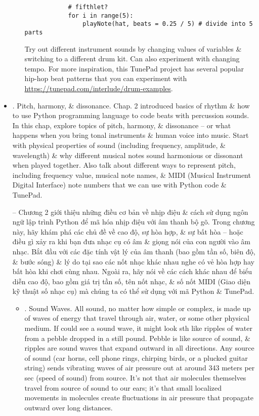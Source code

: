 \documentclass{article}
\begin{document}
\begin{itemize}
\begin{enumerate}
\begin{verbatim}
			# fifthlet?
			for i in range(5):
			    playNote(hat, beats = 0.25 / 5) # divide into 5 parts
		\end{verbatim}
		Try out different instrument sounds by changing values of variables \& switching to a different drum kit. Can also experiment with changing tempo. For more inspiration, this TunePad project has several popular hip-hop beat patterns that you can experiment with \url{https://tunepad.com/interlude/drum-examples}.
	\end{enumerate}
	\item {. Pitch, harmony, \& dissonance.} Chap. 2 introduced basics of rhythm \& how to use Python programming language to code beats with percussion sounds. In this chap, explore topics of pitch, harmony, \& dissonance -- or what happens when you bring tonal instruments \& human voice into music. Start with physical properties of sound (including frequency, amplitude, \& wavelength) \& why different musical notes sound harmonious or dissonant when played together. Also talk about different ways to represent pitch, including frequency value, musical note names, \& MIDI (Musical Instrument Digital Interface) note numbers that we can use with Python code \& TunePad.
	
	-- Chương 2 giới thiệu những điều cơ bản về nhịp điệu \& cách sử dụng ngôn ngữ lập trình Python để mã hóa nhịp điệu với âm thanh bộ gõ. Trong chương này, hãy khám phá các chủ đề về cao độ, sự hòa hợp, \& sự bất hòa -- hoặc điều gì xảy ra khi bạn đưa nhạc cụ có âm \& giọng nói của con người vào âm nhạc. Bắt đầu với các đặc tính vật lý của âm thanh (bao gồm tần số, biên độ, \& bước sóng) \& lý do tại sao các nốt nhạc khác nhau nghe có vẻ hòa hợp hay bất hòa khi chơi cùng nhau. Ngoài ra, hãy nói về các cách khác nhau để biểu diễn cao độ, bao gồm giá trị tần số, tên nốt nhạc, \& số nốt MIDI (Giao diện kỹ thuật số nhạc cụ) mà chúng ta có thể sử dụng với mã Python \& TunePad.
	\begin{itemize}
		\item {. Sound Waves.} All sound, no matter how simple or complex, is made up of waves of energy that travel through air, water, or some other physical medium. If could see a sound wave, it might look sth like ripples of water from a pebble dropped in a still pound. Pebble is like source of sound, \& ripples are sound waves that expand outward in all directions. Any source of sound (car horns, cell phone rings, chirping birds, or a plucked guitar string) sends vibrating waves of air pressure out at around 343 meters per sec (speed of sound) from source. It's not that air molecules themselves travel from source of sound to our ears; it's that small localized movements in molecules create fluctuations in air pressure that propagate outward over long distances.
		

\end{itemize}
\end{itemize}
\end{document}
